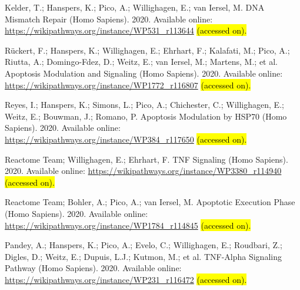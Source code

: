 \documentclass[ijms,article,accept,moreauthors,pdftex]{Definitions/mdpi}
\begin{document}
\begin{thebibliography}{999}
Kelder, T.; Hanspers, K.; Pico, A.; Willighagen, E.; van Iersel, M.
\newblock DNA Mismatch Repair (Homo Sapiens).  2020.
\newblock Available online: \url{https://wikipathways.org/instance/WP531_r113644} \hl{(accessed on). } %

Rückert, F.; Hanspers, K.; Willighagen, E.; Ehrhart, F.; Kalafati, M.; Pico,
  A.; Riutta, A.; Domingo-Fdez, D.; Weitz, E.;  van Iersel, M.;
  Martens, M.; et al.
\newblock Apoptosis Modulation and Signaling (Homo Sapiens).  2020.
\newblock Available online: \url{https://wikipathways.org/instance/WP1772_r116807} \hl{(accessed on). } %

Reyes, I.; Hanspers, K.; Simons, L.; Pico, A.; Chichester, C.; Willighagen, E.;
  Weitz, E.; Bouwman, J.; Romano, P.
\newblock Apoptosis Modulation by HSP70 (Homo Sapiens).  2020.
\newblock Available online: \url{https://wikipathways.org/instance/WP384_r117650} \hl{(accessed on). } %

{Reactome Team}; Willighagen, E.; Ehrhart, F.
\newblock TNF Signaling (Homo Sapiens).  2020.
\newblock Available online: \url{https://wikipathways.org/instance/WP3380_r114940} \hl{(accessed on). } %

{Reactome Team}; Bohler, A.; Pico, A.; van Iersel, M.
\newblock Apoptotic Execution Phase (Homo Sapiens).  2020.
\newblock Available online: \url{https://wikipathways.org/instance/WP1784_r114845} \hl{(accessed on). } %

Pandey, A.; Hanspers, K.; Pico, A.; Evelo, C.;  Willighagen, E.; Roudbari, Z.; Digles, D.; Weitz, E.; Dupuis, L.J.; Kutmon, M.; et al.
\newblock TNF-Alpha Signaling Pathway (Homo Sapiens). 2020. 
\newblock Available online: \url{https://wikipathways.org/instance/WP231_r116472} \hl{(accessed on). } %


\end{thebibliography}
\end{document}
